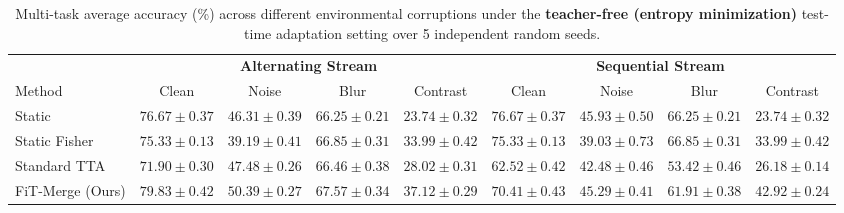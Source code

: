 \begin{table}[t]
\caption{Multi-task average accuracy (\%) across different environmental corruptions under the \textbf{teacher-free (entropy minimization)} test-time adaptation setting over 5 independent random seeds.}
\label{tab:results_free}
\vskip 0.05in
\begin{center}
\begin{scriptsize}
\begin{sc}
\setlength{\tabcolsep}{2.5pt}
\begin{tabular}{lcccccccc}
\toprule
& \multicolumn{4}{c}{\textbf{Alternating Stream}} & \multicolumn{4}{c}{\textbf{Sequential Stream}} \\
\cmidrule(r){2-5} \cmidrule(l){6-9}
Method & Clean & Noise & Blur & Contrast & Clean & Noise & Blur & Contrast \\
\midrule
Static & $76.67 \pm 0.37$ & $46.31 \pm 0.39$ & $66.25 \pm 0.21$ & $23.74 \pm 0.32$ & $\mathbf{76.67 \pm 0.37}$ & $\mathbf{45.93 \pm 0.50}$ & $66.25 \pm 0.21$ & $23.74 \pm 0.32$ \\
Static Fisher & $75.33 \pm 0.13$ & $39.19 \pm 0.41$ & $66.85 \pm 0.31$ & $33.99 \pm 0.42$ & $75.33 \pm 0.13$ & $39.03 \pm 0.73$ & $\mathbf{66.85 \pm 0.31}$ & $33.99 \pm 0.42$ \\
Standard TTA & $71.90 \pm 0.30$ & $47.48 \pm 0.26$ & $66.46 \pm 0.38$ & $28.02 \pm 0.31$ & $62.52 \pm 0.42$ & $42.48 \pm 0.46$ & $53.42 \pm 0.46$ & $26.18 \pm 0.14$ \\
FiT-Merge (Ours) & $\mathbf{79.83 \pm 0.42}$ & $\mathbf{50.39 \pm 0.27}$ & $\mathbf{67.57 \pm 0.34}$ & $\mathbf{37.12 \pm 0.29}$ & $70.41 \pm 0.43$ & $45.29 \pm 0.41$ & $61.91 \pm 0.38$ & $\mathbf{42.92 \pm 0.24}$ \\
\bottomrule
\end{tabular}
\end{sc}
\end{scriptsize}
\end{center}
\vskip -0.15in
\end{table}
